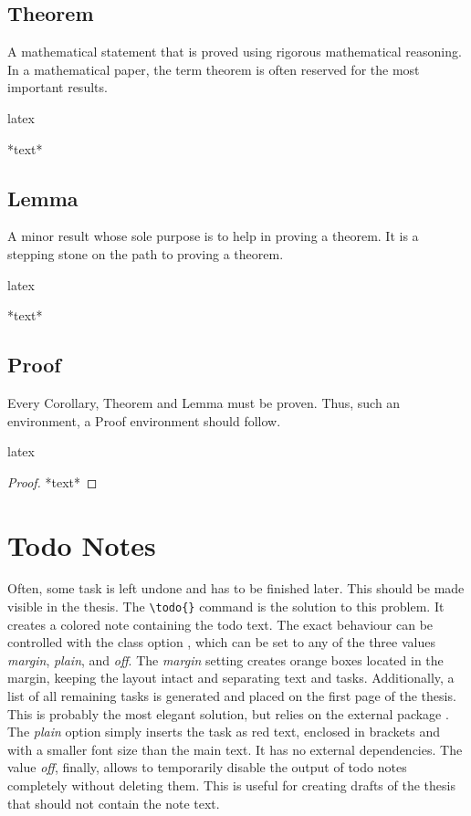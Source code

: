\subsection{Theorem}
A mathematical statement that is proved using rigorous mathematical reasoning.
In a mathematical paper, the term theorem is often reserved for the most
important results.
\begin{code}{latex}
\begin{theorem}
    *text*
\end{theorem}
\end{code}

\subsection{Lemma}
A minor result whose sole purpose is to help in proving a theorem.  It is a
stepping stone on the path to proving a theorem.
\begin{code}{latex}
\begin{lemma}
    *text*
\end{lemma}
\end{code}

\subsection{Proof}
Every Corollary, Theorem and Lemma must be proven. Thus, such an environment,
a Proof environment should follow.
\begin{code}{latex}
\begin{proof}
    *text*
\end{proof}
\end{code}

\section{Todo Notes}%
\label{sec:todo}

Often, some task is left undone and has to be finished later.  This should be
made visible in the thesis. The \verb!\todo{}! command is the solution to this
problem.  It creates a colored note containing the todo text. The exact behaviour can be controlled with the class option
, which can be set to any of the three values \emph{margin},
\emph{plain}, and \emph{off}.  The \emph{margin} setting creates orange boxes
located in the margin, keeping the layout intact and separating text and
tasks. Additionally, a list of all remaining tasks is generated and placed on
the first page of the thesis. This is probably the most elegant solution, but
relies on the external package .  The \emph{plain} option
simply inserts the task as red text, enclosed in brackets and with a smaller
font size than the main text. It has no external dependencies.  The value
\emph{off}, finally, allows to temporarily disable the output of todo notes
completely without deleting them.  This is useful for creating drafts of the
thesis that should not contain the note text.

